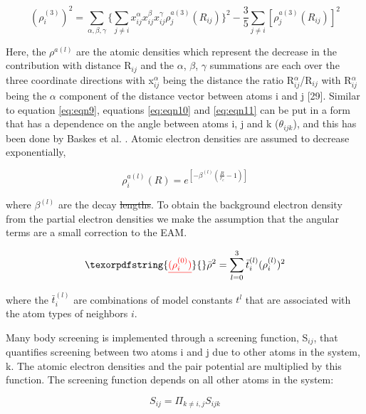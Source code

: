 \documentclass[review]{elsarticle}
\providecommand{\DIFaddtex}[1]{{\protect\color{blue}\uwave{#1}}} %
\providecommand{\DIFdeltex}[1]{{\protect\color{red}\sout{#1}}}                      %
\providecommand{\DIFaddbegin}{} %
\providecommand{\DIFaddend}{} %
\providecommand{\DIFdelbegin}{} %
\providecommand{\DIFdelend}{} %
\providecommand{\DIFadd}[1]{\texorpdfstring{\DIFaddtex{#1}}{#1}} %
\providecommand{\DIFdel}[1]{\texorpdfstring{\DIFdeltex{#1}}{}} %
\newcommand{\DIFscaledelfig}{0.5}
\newlength{\DIFdelgraphicswidth} %
\newlength{\DIFdelgraphicsheight} %
\newcommand{\DIFaddincludegraphics}[2][]{{\color{blue}\fbox{\DIFOincludegraphics[#1]{#2}}}} %
\newcommand{\DIFdelincludegraphics}[2][]{%
\sbox{\DIFdelgraphicsbox}{\DIFOincludegraphics[#1]{#2}}%
\settoboxwidth{\DIFdelgraphicswidth}{\DIFdelgraphicsbox} %
\settoboxtotalheight{\DIFdelgraphicsheight}{\DIFdelgraphicsbox} %
\scalebox{\DIFscaledelfig}{%
\parbox[b]{\DIFdelgraphicswidth}{\usebox{\DIFdelgraphicsbox}\\[-\baselineskip] \rule{\DIFdelgraphicswidth}{0em}}\llap{\resizebox{\DIFdelgraphicswidth}{\DIFdelgraphicsheight}{%
\setlength{\unitlength}{\DIFdelgraphicswidth}%
\begin{picture}(1,1)%
\thicklines\linethickness{2pt} %
{\color[rgb]{1,0,0}\put(0,0){\framebox(1,1){}}}%
{\color[rgb]{1,0,0}\put(0,0){\line( 1,1){1}}}%
{\color[rgb]{1,0,0}\put(0,1){\line(1,-1){1}}}%
\end{picture}%
}\hspace*{3pt}}} %
} %
\DeclareRobustCommand{\DIFaddbegin}{\DIFOaddbegin \let\includegraphics\DIFaddincludegraphics} %
\DeclareRobustCommand{\DIFaddend}{\DIFOaddend \let\includegraphics\DIFOincludegraphics} %
\DeclareRobustCommand{\DIFdelbegin}{\DIFOdelbegin \let\includegraphics\DIFdelincludegraphics} %
\DeclareRobustCommand{\DIFdelend}{\DIFOaddend \let\includegraphics\DIFOincludegraphics} %
\begin{document}
\begin{equation}
\label{eq:eqn11}
(\rho_{i}^{(3)})^{2}=\sum_{\alpha,\beta,\gamma}\{ \sum_{j \neq i}x_{ij}^{\alpha}x_{ij}^{\beta}x_{ij}^{\gamma}\rho_{j}^{a(3)}(R_{ij}) \}^{2} - \frac{3}{5}\sum_{j \neq i}[\rho_{j}^{a(3)}(R_{ij})]^2
\end{equation}

Here, the $\rho^{a(l)}$  are the atomic densities which represent the decrease in the contribution with distance R$_{ij}$ and the $\alpha$, $\beta$, $\gamma$ summations are each over the three coordinate directions with x$_{ij}^{\alpha}$ being the distance the ratio R$_{ij}^{\alpha}$/R$_{ij}$ with R$_{ij}^{\alpha}$ being the $\alpha$ component of the distance vector between atoms i and j [29].  Similar to equation \ref{eq:eqn9}, equations \ref{eq:eqn10} and \ref{eq:eqn11} can be put in a form that has a dependence on the angle between atoms i, j and k ($\theta_{ijk}$), and this has been done by Baskes et al. \cite{baskes1989}.  Atomic electron densities are assumed to decrease exponentially, 

\begin{equation}
\label{eq:eqn12}
\rho_{i}^{a(l)}(R) = e^{[-\beta^{(l)}(\frac{R}{r_{e}}-1)]}
\end{equation}

where $\beta^{(l)}$ are the decay \DIFdelbegin \DIFdel{lengths}\DIFdelend \DIFaddbegin \DIFadd{constants}\DIFaddend .  To obtain the background electron density from the partial electron densities we make the assumption that the angular terms are a small correction to the EAM.

\begin{equation}
\label{eq:eqn13}
\DIFdelbegin \DIFdel{(\rho_{i}^{(0)})}\DIFdelend \DIFaddbegin \bar{\rho}\DIFaddend ^{2} = \sum_{l=0}^{3}\bar{t}_{i}^{(l)} (\rho_{i}^{(l)})^{2}
\end{equation}

where the $\bar{t}_{i}^{(l)}$ \cite{valone2006} are combinations of model constants $t^{l}$ that are associated with the atom types of neighbors $i$.

Many body screening is implemented through a screening function, S$_{ij}$, that quantifies screening between two atoms i and j due to other atoms in the system, k.  The atomic electron densities and the pair potential are multiplied by this function.  The screening function depends on all other atoms in the system:

\begin{equation}
\label{eq:eqn14}
S_{ij}=\Pi_{k \neq i,j}S_{ijk}
\end{equation}
\end{document}

